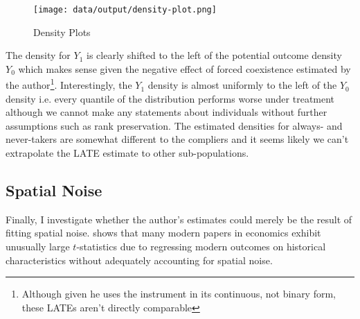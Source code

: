 \documentclass[12pt]{article}
\begin{document}
\begin{figure}[htbp]
    \centering
    \texttt{[image: data/output/density-plot.png]}
    \caption{Density Plots}
    \label{dens}
\end{figure}


The density for $Y_1$ is clearly shifted to the left of the potential outcome density $Y_0$ which makes sense given the negative effect 
of forced coexistence estimated by the author\footnote{Although given he uses the instrument in its continuous, not binary form, these LATEs aren't directly comparable}. Interestingly, the $Y_1$ density is almost uniformly to the left of the $Y_0$ density i.e. 
every quantile of the distribution performs worse under treatment although we cannot make any statements about individuals without 
further assumptions such as rank preservation. The estimated densities for always- and never-takers are somewhat different to the compliers 
and it seems likely we can't extrapolate the LATE estimate to other sub-populations.




% 


\subsection{Spatial Noise}
Finally, I investigate whether the author's estimates could merely be the result of fitting spatial noise. \cite{persistence} shows that many modern 
papers in economics exhibit unusually large $t$-statistics due to regressing modern outcomes on historical characteristics without adequately accounting for 
spatial noise. 
\end{document}
